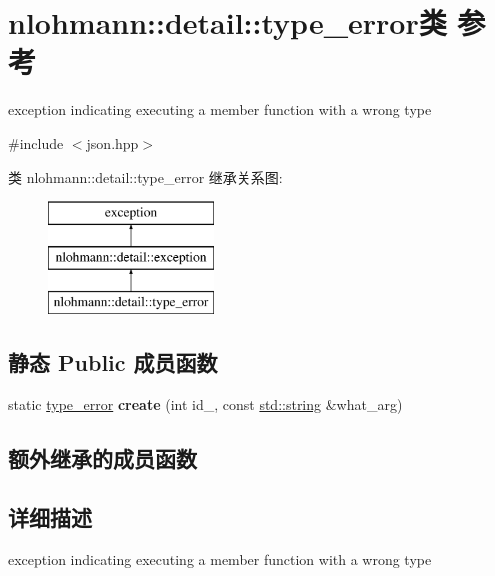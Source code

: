 \hypertarget{classnlohmann_1_1detail_1_1type__error}{}\section{nlohmann\+::detail\+::type\+\_\+error类 参考}
\label{classnlohmann_1_1detail_1_1type__error}


exception indicating executing a member function with a wrong type  




{\ttfamily \#include $<$json.\+hpp$>$}

类 nlohmann\+::detail\+::type\+\_\+error 继承关系图\+:\begin{figure}[H]
\begin{center}
\leavevmode
\includegraphics[height=3.000000cm]{classnlohmann_1_1detail_1_1type__error}
\end{center}
\end{figure}
\subsection*{静态 Public 成员函数}
\begin{DoxyCompactItemize}
\item 
\mbox{\label{classnlohmann_1_1detail_1_1type__error_aecc083aea4b698c33d042670ba50c10f}} 
static \mbox{\hyperlink{classnlohmann_1_1detail_1_1type__error}{type\+\_\+error}} {\bfseries create} (int id\+\_\+, const \mbox{\hyperlink{namespacenlohmann_1_1detail_a1ed8fc6239da25abcaf681d30ace4985ab45cffe084dd3d20d928bee85e7b0f21}{std\+::string}} \&what\+\_\+arg)
\end{DoxyCompactItemize}
\subsection*{额外继承的成员函数}


\subsection{详细描述}
exception indicating executing a member function with a wrong type 


